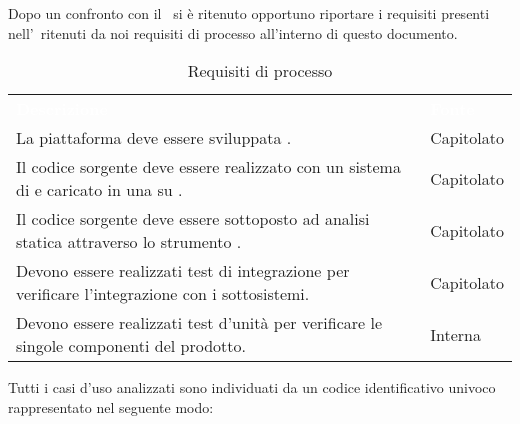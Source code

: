 \label{RequisitiProcesso}Dopo un confronto con il \VT\ si è ritenuto opportuno riportare i requisiti presenti nell'\AdR\ ritenuti da noi requisiti di processo all'interno di questo documento.\\
\begin{table}[h]
	\centering
	\caption{Requisiti di processo} 
\renewcommand{\arraystretch}{1.5}
\begin{tabular}{|C{9.5cm} C{2.5cm}|} 
	
	\textcolor{white}{\textbf{Descrizione}}&
	\textcolor{white}{\textbf{Fonte}}\\	

	La piattaforma deve essere sviluppata . & Capitolato\\
	Il codice sorgente deve essere realizzato con un sistema di  e caricato in una  su . & Capitolato\\
	Il codice sorgente deve essere sottoposto ad analisi statica attraverso lo strumento . & Capitolato\\
	Devono essere realizzati test di integrazione per verificare l’integrazione con i sottosistemi. & Capitolato\\
	Devono essere realizzati test d’unità per verificare le singole componenti del prodotto. & Interna\\
	\hline
\end{tabular}
\end{table}

Tutti i casi d'uso analizzati sono individuati da un codice identificativo univoco rappresentato nel seguente modo:

